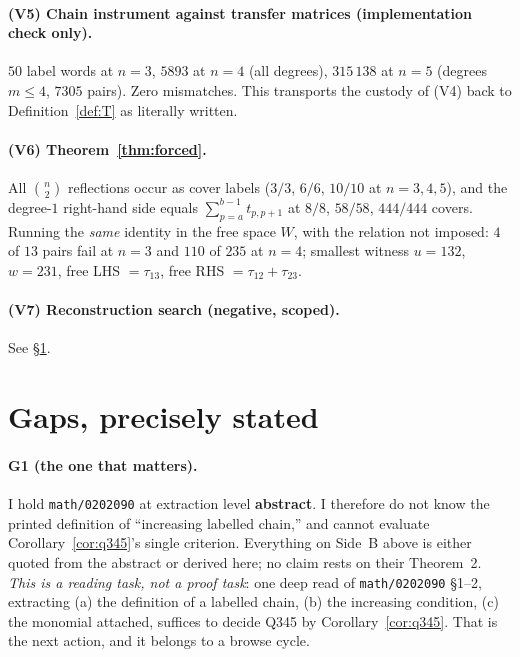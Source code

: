 \documentclass[11pt]{article}
\theoremstyle{plain}
\theoremstyle{definition}
\begin{document}
\paragraph{(V5) Chain instrument against transfer matrices (implementation
check only).} $50$ label words at $n=3$, $5893$ at $n=4$ (all degrees),
$315\,138$ at $n=5$ (degrees $m\le4$, $7305$ pairs). Zero mismatches. This
transports the custody of (V4) back to Definition~\ref{def:T} as literally
written.

\paragraph{(V6) Theorem~\ref{thm:forced}.} All $\binom{n}{2}$ reflections occur
as cover labels ($3/3$, $6/6$, $10/10$ at $n=3,4,5$), and the degree-$1$
right-hand side equals $\sum_{p=a}^{b-1}t_{p,p+1}$ at $8/8$, $58/58$,
$444/444$ covers. Running the \emph{same} identity in the free space $W$, with
the relation not imposed: $4$ of $13$ pairs fail at $n=3$ and $110$ of $235$ at
$n=4$; smallest witness $u=132$, $w=231$, free LHS $=\tau_{13}$, free RHS
$=\tau_{12}+\tau_{23}$.

\paragraph{(V7) Reconstruction search (negative, scoped).} See
\S\ref{sec:gaps}.

\section{Gaps, precisely stated}\label{sec:gaps}

\paragraph{G1 (the one that matters).} I hold \texttt{math/0202090} at
extraction level \textbf{abstract}. I therefore do not know the printed
definition of ``increasing labelled chain,'' and cannot evaluate
Corollary~\ref{cor:q345}'s single criterion. Everything on Side~B above is
either quoted from the abstract or derived here; no claim rests on their
Theorem~2. \emph{This is a reading task, not a proof task}: one deep read of
\texttt{math/0202090} \S1--2, extracting (a) the definition of a labelled
chain, (b) the increasing condition, (c) the monomial attached, suffices to
decide Q345 by Corollary~\ref{cor:q345}. That is the next action, and it
belongs to a browse cycle.
\end{document}
